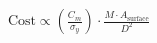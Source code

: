 \documentclass[preview]{standalone}
\begin{document}
\begin{align*}
\text{Cost} \propto \left( \frac{C_m}{\sigma_y} \right) \cdot \frac{M \cdot A_{\text{surface}}}{D^2}
\end{align*}
\end{document}
